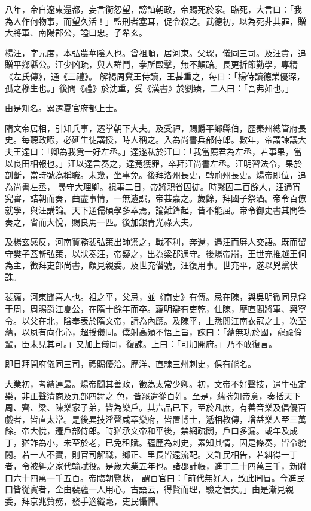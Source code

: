 \begin{pinyinscope}
 八年，帝自遼東還都，妄言衡怨望，謗訕朝政，帝賜死於家。臨死，大言曰：「我為人作何物事，而望久活！」監刑者塞耳，促令殺之。武德初，以為死非其罪，贈大將軍、南陽郡公，謚曰忠。子希玄。



 楊汪，字元度，本弘農華陰人也。曾祖順，居河東。父琛，儀同三司。及汪貴，追贈平鄉縣公。汪少凶疏，與人群鬥，拳所毆擊，無不顛踣。長更折節勤學，專精《左氏傳》，通《三禮》。
 解褐周冀王侍讀，王甚重之，每曰：「楊侍讀德業優深，孤之穆生也。」後問《禮》於沈重，受《漢書》於劉臻，二人曰：「吾弗如也。」



 由是知名。累遷夏官府都上士。



 隋文帝居相，引知兵事，遷掌朝下大夫。及受禪，賜爵平鄉縣伯，歷秦州總管府長史。每聽政暇，必延生徒講授，時人稱之。入為尚書兵部侍郎。數年，帝謂諫議大夫王達曰：「卿為我覓一好左丞。」達遂私於汪曰：「我當薦君為左丞，若事果，當以良田相報也。」汪以達言奏之，達竟獲罪，卒拜汪尚書左丞。汪明習法令，果於剖斷，當時號為稱職。未幾，坐事免。後拜洛州長史，轉荊州長史。煬帝即位，追為尚書左丞，
 尋守大理卿。視事二日，帝將親省囚徒。時繫囚二百餘人，汪通宵究審，詰朝而奏，曲盡事情，一無遺誤，帝甚嘉之。歲餘，拜國子祭酒。帝令百僚就學，與汪講論。天下通儒碩學多萃焉，論難鋒起，皆不能屈。帝令御史書其問答奏之，省而大悅，賜良馬一匹。後加銀青光祿大夫。



 及楊玄感反，河南贊務裴弘策出師禦之，戰不利，奔還，遇汪而屏人交語。既而留守樊子蓋斬弘策，以狀奏汪，帝疑之，出為梁郡通守。後煬帝崩，王世充推越王侗為主，徵拜吏部尚書，頗見親委。及世充僭號，汪復用事。世充平，遂以兇黨伏誅。



 裴蘊，河東聞喜人也。祖之平，父忌，並《南史》有傳。忌在陳，與吳明徹同見俘于周，周賜爵江夏公，在隋十餘年而卒。蘊明辯有吏乾，仕陳，歷直閣將軍、興寧令。以父在北，陰奉表於隋文帝，請為內應。及陳平，上悉閱江南衣冠之士，次至蘊，以夙有向化心，超授儀同。僕射高熲不悟上旨，諫曰：「蘊無功於國，寵踰倫輩，臣未見其可。」又加上儀同，復諫。上曰：「可加開府。」乃不敢復言。



 即日拜開府儀同三司，禮賜優洽。歷洋、直隸三州刺史，俱有能名。



 大業初，考績連最。煬帝聞其善政，徵為太常少卿。初，文帝不好聲技，遣牛弘定樂，非正聲清商及九部四舞之
 色，皆罷遣從百姓。至是，蘊揣知帝意，奏括天下周、齊、梁、陳樂家子弟，皆為樂戶。其六品已下，至於凡庶，有善音樂及倡優百戲者，皆直太常。是後異技淫聲咸萃樂府，皆置博士，遞相教傳，增益樂人至三萬餘。帝大悅，遷戶部侍郎。時猶承文帝和平後，禁網疏闊，戶口多漏。或年及成丁，猶詐為小，未至於老，已免租賦。蘊歷為刺史，素知其情，因是條奏，皆令貌閱。若一人不實，則官司解職，鄉正、里長皆遠流配。又許民相告，若糾得一丁者，令被糾之家代輸賦役。是歲大業五年也。諸郡計帳，進丁二十四萬三千，新附口六十四萬一千五百。帝臨朝覽狀，
 謂百官曰：「前代無好人，致此罔冒。今進民口皆從實者，全由裴蘊一人用心。古語云，得賢而理，驗之信矣。」由是漸見親委，拜京兆贊務，發手適纖毫，吏民懾憚。




\end{pinyinscope}
